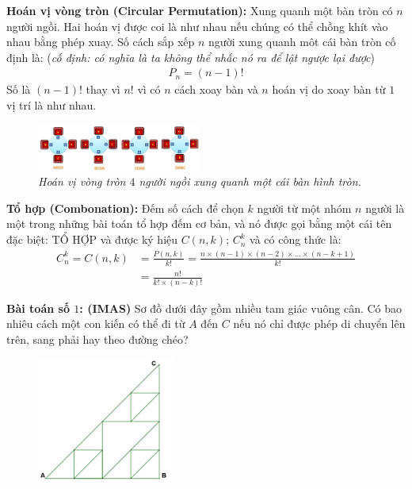 \begin{multicols}{2}
	\textbf{Hoán vị vòng tròn (Circular Permutation):} Xung quanh một bàn tròn có $n$ người ngồi. Hai hoán vị được coi là như nhau nếu chúng có thể chồng khít vào nhau bằng phép xuay. Số cách sắp xếp $n$ người xung quanh môt cái bàn tròn cố định là: (\textit{cố định: có nghĩa là ta không thể nhấc nó ra để lật ngược lại được})
	\begin{align*}
		P_n=(n-1)!
	\end{align*}
	Số là $(n-1)!$ thay vì $n!$ vì có $n$ cách xoay bàn và $n$ hoán vị do xoay bàn từ $1$ vị trí là như nhau.
	\begin{figure}[H]
		\centering
		\vspace*{-5pt}
		\captionsetup{labelformat=empty, justification=centering}
		\includegraphics[width=0.48\textwidth]{_5}
		\caption{\small\textit{Hoán vị vòng tròn $4$ người ngồi xung quanh một cái bàn hình tròn.}}
		\vspace*{-15pt}
	\end{figure}
	\textbf{Tổ hợp (Combonation):}  Đếm số cách để chọn $k$ người từ một nhóm $n$ người là một trong những bài toán tổ hợp đếm cơ bản, và nó được gọi bằng một cái tên đặc biệt: TỔ HỢP và được ký hiệu  $C(n,k)$; $C_n^k$ và có công thức là:
	\begin{align*}
		C_n^k=C(n,k)&=\frac{P(n,k)}{k!} = \frac{n\times(n-1)\times(n-2)\times\ldots \times(n-k+1)}{k!}\\
		& = \frac{n!}{k!\times(n-k)!}
	\end{align*}
	\begin{multicols}{2}
		\textbf{Bài toán số $1$: (IMAS)}
		\vskip 0.1cm
		Sơ đồ dưới đây gồm nhiều tam giác vuông cân.
		\vskip 0.1cm
		Có bao nhiêu cách một con kiến có thể đi từ $A$ đến $C$ nếu nó chỉ được phép di chuyển lên trên, sang phải hay theo đường chéo? 
		\begin{figure}[H]
			\centering
			\vspace*{-5pt}
			\captionsetup{labelformat=empty, justification=centering}
			\includegraphics[width=0.4\textwidth]{_6}

\end{figure}
\end{multicols}
\end{multicols}
